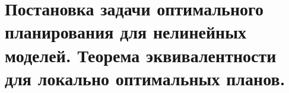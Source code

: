 \section{Постановка задачи оптимального планирования для нелинейных моделей. Теорема эквивалентности для локально оптимальных планов.}
